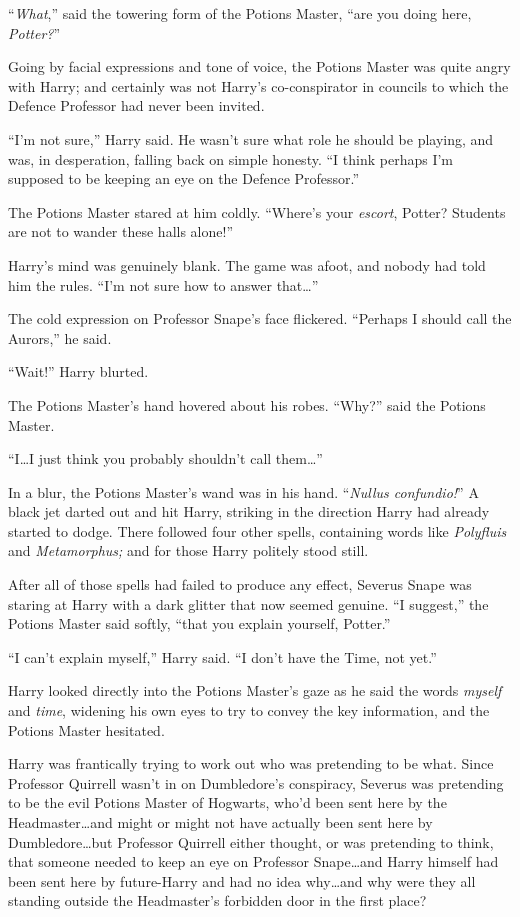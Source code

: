 “\emph{What},” said the towering form of the Potions Master, “are you doing here, \emph{Potter?}”

Going by facial expressions and tone of voice, the Potions Master was quite angry with Harry; and certainly was not Harry’s co-conspirator in councils to which the Defence Professor had never been invited.

“I’m not sure,” Harry said. He wasn’t sure what role he should be playing, and was, in desperation, falling back on simple honesty.
“I think perhaps I’m supposed to be keeping an eye on the Defence Professor.”

The Potions Master stared at him coldly.
“Where’s your \emph{escort}, Potter? Students are not to wander these halls alone!”

Harry’s mind was genuinely blank. The game was afoot, and nobody had told him the rules.
“I’m not sure how to answer that…”

The cold expression on Professor Snape’s face flickered.
“Perhaps I should call the Aurors,” he said.

“Wait!” Harry blurted.

The Potions Master’s hand hovered about his robes.
“Why?” said the Potions Master.

“I…I just think you probably shouldn’t call them…”

In a blur, the Potions Master’s wand was in his hand. “\emph{Nullus confundio!}” A black jet darted out and hit Harry, striking in the direction Harry had already started to dodge. There followed four other spells, containing words like \emph{Polyfluis} and \emph{Metamorphus;} and for those Harry politely stood still.

After all of those spells had failed to produce any effect, Severus Snape was staring at Harry with a dark glitter that now seemed genuine.
“I suggest,” the Potions Master said softly, “that you explain yourself, Potter.”

“I can’t explain myself,” Harry said.
“I don’t have the Time, not yet.”

Harry looked directly into the Potions Master’s gaze as he said the words \emph{myself} and \emph{time}, widening his own eyes to try to convey the key information, and the Potions Master hesitated.

Harry was frantically trying to work out who was pretending to be what. Since Professor Quirrell wasn’t in on Dumbledore’s conspiracy, Severus was pretending to be the evil Potions Master of Hogwarts, who’d been sent here by the Headmaster…and might or might not have actually been sent here by Dumbledore…but Professor Quirrell either thought, or was pretending to think, that someone needed to keep an eye on Professor Snape…and Harry himself had been sent here by future-Harry and had no idea why…and why were they all standing outside the Headmaster’s forbidden door in the first place?


